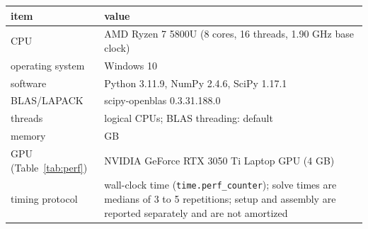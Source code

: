 \begin{tabular}{>{\raggedright\arraybackslash}p{}>{\raggedright\arraybackslash}p{}}
\toprule
item & value\\
\midrule
CPU & AMD Ryzen 7 5800U (8 cores, 16 threads, 1.90 GHz base clock)\\
operating system & Windows 10\\
software & Python 3.11.9, NumPy 2.4.6, SciPy 1.17.1\\
BLAS/LAPACK & scipy-openblas 0.3.31.188.0\\
threads & 16 logical CPUs; BLAS threading: default\\
memory & 16 GB\\
GPU (Table~\ref{tab:perf}) & NVIDIA GeForce RTX 3050 Ti Laptop GPU (4 GB)\\
timing protocol & wall-clock time (\texttt{time.perf\_counter}); solve times are medians of 3 to 5 repetitions; setup and assembly are reported separately and are not amortized\\
\bottomrule
\end{tabular}
